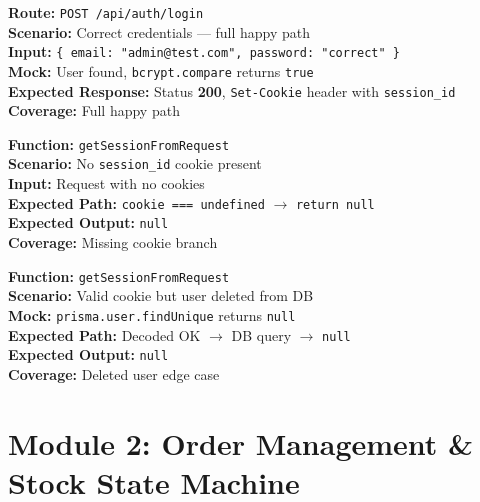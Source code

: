 \documentclass[12pt,a4paper]{report}
\newcommand{\pone}{\textbf{\color{p1red}P1}}
\newcommand{\ptwo}{\textbf{\color{p2orange}P2}}
\begin{document}
\begin{tcolorbox}[testbox, title={AUTH-014 \hfill \pone}]
\textbf{Route:} \texttt{POST /api/auth/login} \\
\textbf{Scenario:} Correct credentials --- full happy path \\
\textbf{Input:} \texttt{\{ email: "admin@test.com", password: "correct" \}} \\
\textbf{Mock:} User found, \texttt{bcrypt.compare} returns \texttt{true} \\
\textbf{Expected Response:} Status \textbf{200}, \texttt{Set-Cookie} header with \texttt{session\_id} \\
\textbf{Coverage:} Full happy path
\end{tcolorbox}

\begin{tcolorbox}[testbox, title={AUTH-015 \hfill \pone}]
\textbf{Function:} \texttt{getSessionFromRequest} \\
\textbf{Scenario:} No \texttt{session\_id} cookie present \\
\textbf{Input:} Request with no cookies \\
\textbf{Expected Path:} \texttt{cookie === undefined} $\to$ \texttt{return null} \\
\textbf{Expected Output:} \texttt{null} \\
\textbf{Coverage:} Missing cookie branch
\end{tcolorbox}

\begin{tcolorbox}[testbox, title={AUTH-016 \hfill \ptwo}]
\textbf{Function:} \texttt{getSessionFromRequest} \\
\textbf{Scenario:} Valid cookie but user deleted from DB \\
\textbf{Mock:} \texttt{prisma.user.findUnique} returns \texttt{null} \\
\textbf{Expected Path:} Decoded OK $\to$ DB query $\to$ \texttt{null} \\
\textbf{Expected Output:} \texttt{null} \\
\textbf{Coverage:} Deleted user edge case
\end{tcolorbox}


\chapter{Module 2: Order Management \& Stock State Machine}
\end{document}
